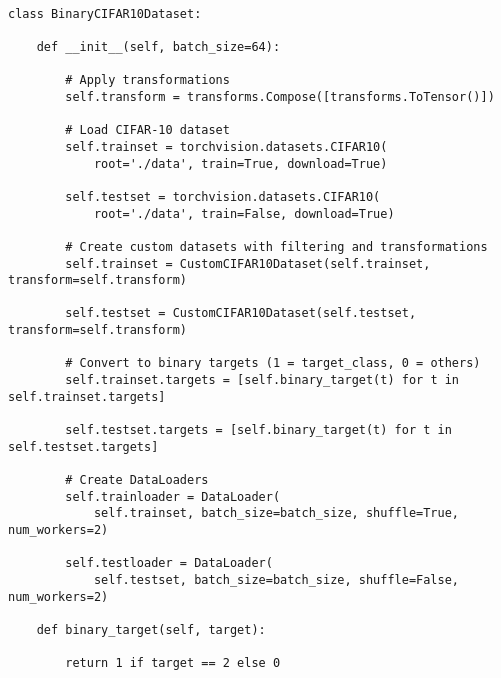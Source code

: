 \begin{minipage}{\linewidth}
\begin{lstlisting}[caption=BinaryCIFAR10Dataset, label={lst:BinaryCIFAR10Dataset}]

class BinaryCIFAR10Dataset:

    def __init__(self, batch_size=64):

        # Apply transformations
        self.transform = transforms.Compose([transforms.ToTensor()])

        # Load CIFAR-10 dataset
        self.trainset = torchvision.datasets.CIFAR10(
            root='./data', train=True, download=True)
        
        self.testset = torchvision.datasets.CIFAR10(
            root='./data', train=False, download=True)

        # Create custom datasets with filtering and transformations
        self.trainset = CustomCIFAR10Dataset(self.trainset, transform=self.transform)

        self.testset = CustomCIFAR10Dataset(self.testset, transform=self.transform)

        # Convert to binary targets (1 = target_class, 0 = others)
        self.trainset.targets = [self.binary_target(t) for t in self.trainset.targets]
        
        self.testset.targets = [self.binary_target(t) for t in self.testset.targets]

        # Create DataLoaders
        self.trainloader = DataLoader(
            self.trainset, batch_size=batch_size, shuffle=True, num_workers=2)
        
        self.testloader = DataLoader(
            self.testset, batch_size=batch_size, shuffle=False, num_workers=2)
        
    def binary_target(self, target):
        
        return 1 if target == 2 else 0
\end{lstlisting}
\end{minipage}